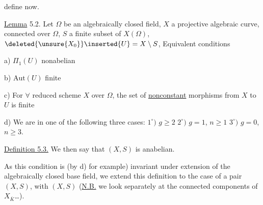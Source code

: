 

define now.

\uline{Lemma} 5.2. Let $\Omega$ be an algebraically closed field, $X$ a   projective algebraic curve, connected over $\Omega$, $S$ a finite subset of $X(\Omega)$,  $\deleted{\unsure{X_0}}\inserted{U}=X\setminus S$, Equivalent conditions

a) $\Pi_1(U)$ nonabelian

b) $\mathrm{Aut}(U)$ finite

c) For $\forall$  reduced scheme $X$  over $\Omega$, the set of \uline{nonconstant} morphisms from $X$ to $U$ is finite

d) We are  in one of the following three cases: $1^\circ)$  $g\geq 2$ \quad $2^\circ)$ $g=1$, $n\geq 1$ \quad $3^\circ)$ $g=0$, $n\geq 3$.


\uline{Definition 5.3.} We then say that $(X,S)$ is anabelian. 

As this condition is (by d) for example) invariant under extension of the algebraically closed base field, we extend this definition to the case of a pair $(X,S)$, with $(X,S)$   (\uline{N.B.} we look separately at the connected components of $X_{\overline K}$\dots).

